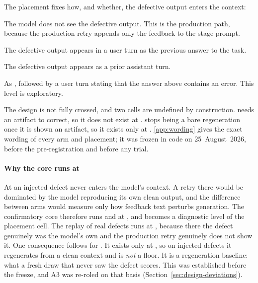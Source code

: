 \noindent The placement fixes how, and whether, the defective output enters
the context:

\begin{description}[leftmargin=1.2em,style=nextline]
\item[\arm{P0}, artifact absent.] The model does not see the defective output.
  This is the production path, because the production retry appends only the
  feedback to the stage prompt.
\item[\arm{P1}, artifact under review.] The defective output appears in a user
  turn as the previous answer to the task.
\item[\arm{P2}, artifact as the model's own turn.] The defective output appears
  as a prior assistant turn.
\item[\arm{P3}, own turn with a marker.] As , followed by a user turn
  stating that the answer above contains an error. This level is exploratory.
\end{description}

\noindent The design is not fully crossed, and two cells are undefined by
construction.  needs an artifact to correct, so it does not exist at
.  stops being a bare regeneration once it is shown an
artifact, so it exists only at . \ref{app:wording} gives the exact
wording of every arm and placement; it was frozen in code on
25~August~2026, before the pre-registration and before any trial.

\paragraph{Why the core runs at }
At  an injected defect never enters the model's context. A retry there
would be dominated by the model reproducing its own clean output, and the
difference between arms would measure only how feedback text perturbs
generation. The confirmatory core therefore runs  and  at
, and  becomes a diagnostic level of the placement cell. The
replay of real defects runs at , because there the defect genuinely was
the model's own and the production retry genuinely does not show it. One
consequence follows for . It exists only at , so on injected
defects it regenerates from a clean context and is \emph{not} a floor. It is a
regeneration baseline: what a fresh draw that never saw the defect scores.
This was established before the freeze, and A3 was re-roled on that basis
(Section~\ref{sec:design-deviations}).

